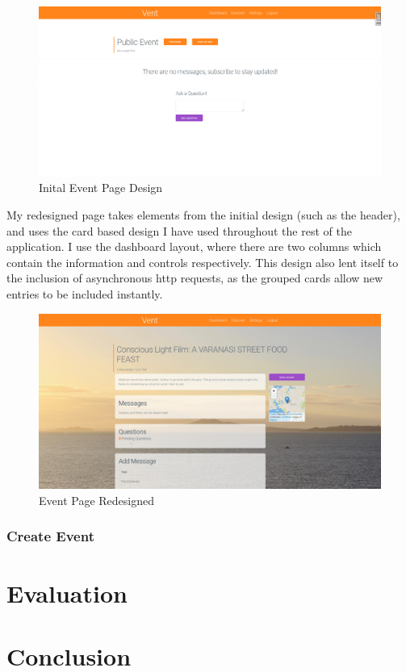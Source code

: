 \documentclass[a4paper,oneside,12pt,draft]{report}
\begin{document}
	\begin{figure}[H]
		\caption{Inital Event Page Design}
		\includegraphics[width=\linewidth]{static/front-end6.png}
	\end{figure}
	
	My redesigned page takes elements from the initial design (such as the header), and uses the card based design I have used throughout the rest of the application. I use the dashboard layout, where there are two columns which contain the information and controls respectively. This design also lent itself to the inclusion of asynchronous http requests, as the grouped cards allow new entries to be included instantly.
	
	\begin{figure}[H]
		\caption{Event Page Redesigned}
		\includegraphics[width=\linewidth]{static/front-end7.jpg}
	\end{figure}


	\subsection{Create Event}
	
	

	\chapter{Evaluation}

	\chapter{Conclusion}

	\printbibliography

	\printglossaries
\end{document}
